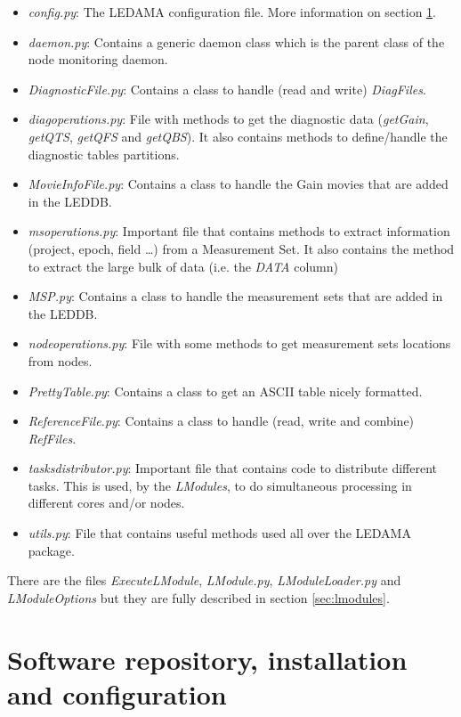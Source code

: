 \documentclass[a4paper,11pt]{article}
\begin{document}
\begin{itemize}
    \item \textit{config.py}: The LEDAMA configuration file. More information on section \ref{sec:config}.
    \item \textit{daemon.py}: Contains a generic daemon class which is the parent class of the node monitoring daemon.
    \item \textit{DiagnosticFile.py}: Contains a class to handle (read and write) \textit{DiagFiles}.
    \item \textit{diagoperations.py}: File with methods to get the diagnostic data (\textit{getGain}, \textit{getQTS}, \textit{getQFS} and \textit{getQBS}). It also contains methods to define/handle the diagnostic tables partitions.
    \item \textit{MovieInfoFile.py}: Contains a class to handle the Gain movies that are added in the LEDDB.
    \item \textit{msoperations.py}: Important file that contains methods to extract information (project, epoch, field \ldots) from a Measurement Set. It also contains the method to extract the large bulk of data (i.e. the \textit{DATA} column)
    \item \textit{MSP.py}: Contains a class to handle the measurement sets that are added in the LEDDB.
    \item \textit{nodeoperations.py}: File with some methods to get measurement sets locations from nodes.
    \item \textit{PrettyTable.py}: Contains a class to get an ASCII table nicely formatted.
    \item \textit{ReferenceFile.py}: Contains a class to handle (read, write and combine) \textit{RefFiles}.
    \item \textit{tasksdistributor.py}: Important file that contains code to distribute different tasks. This is used, by the \textit{LModules}, to do simultaneous processing in different cores and/or nodes.
    \item \textit{utils.py}: File that contains useful methods used all over the LEDAMA package.
\end{itemize}
 
There are the files \textit{ExecuteLModule}, \textit{LModule.py}, \textit{LModuleLoader.py} and \textit{LModuleOptions} but they are fully described in section \ref{sec:lmodules}.

\section{Software repository, installation and configuration}
\label{sec:config}
\end{document}
